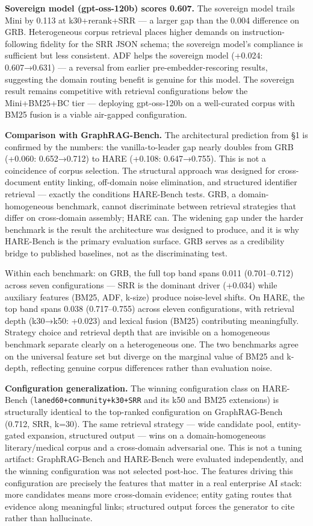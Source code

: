 \textbf{Sovereign model (gpt-oss-120b) scores 0.607.} The sovereign model trails Mini by 0.113 at k30+rerank+SRR --- a larger gap than the 0.004 difference on GRB. Heterogeneous corpus retrieval places higher demands on instruction-following fidelity for the SRR JSON schema; the sovereign model's compliance is sufficient but less consistent. ADF helps the sovereign model (+0.024: 0.607→0.631) --- a reversal from earlier pre-embedder-rescoring results, suggesting the domain routing benefit is genuine for this model. The sovereign result remains competitive with retrieval configurations below the Mini+BM25+BC tier --- deploying gpt-oss-120b on a well-curated corpus with BM25 fusion is a viable air-gapped configuration.

\textbf{Comparison with GraphRAG-Bench.} The architectural prediction from §1 is confirmed by the numbers: the vanilla-to-leader gap nearly doubles from GRB (+0.060: 0.652→0.712) to HARE (+0.108: 0.647→0.755). This is not a coincidence of corpus selection. The structural approach was designed for cross-document entity linking, off-domain noise elimination, and structured identifier retrieval --- exactly the conditions HARE-Bench tests. GRB, a domain-homogeneous benchmark, cannot discriminate between retrieval strategies that differ on cross-domain assembly; HARE can. The widening gap under the harder benchmark is the result the architecture was designed to produce, and it is why HARE-Bench is the primary evaluation surface. GRB serves as a credibility bridge to published baselines, not as the discriminating test.

Within each benchmark: on GRB, the full top band spans 0.011 (0.701--0.712) across seven configurations --- SRR is the dominant driver (+0.034) while auxiliary features (BM25, ADF, k-size) produce noise-level shifts. On HARE, the top band spans 0.038 (0.717--0.755) across eleven configurations, with retrieval depth (k30→k50: +0.023) and lexical fusion (BM25) contributing meaningfully. Strategy choice and retrieval depth that are invisible on a homogeneous benchmark separate clearly on a heterogeneous one. The two benchmarks agree on the universal feature set but diverge on the marginal value of BM25 and k-depth, reflecting genuine corpus differences rather than evaluation noise.

\textbf{Configuration generalization.} The winning configuration class on HARE-Bench (\texttt{laned60+community+k30+SRR} and its k50 and BM25 extensions) is structurally identical to the top-ranked configuration on GraphRAG-Bench (0.712, SRR, k=30). The same retrieval strategy --- wide candidate pool, entity-gated expansion, structured output --- wins on a domain-homogeneous literary/medical corpus and a cross-domain adversarial one. This is not a tuning artifact: GraphRAG-Bench and HARE-Bench were evaluated independently, and the winning configuration was not selected post-hoc. The features driving this configuration are precisely the features that matter in a real enterprise AI stack: more candidates means more cross-domain evidence; entity gating routes that evidence along meaningful links; structured output forces the generator to cite rather than hallucinate.

